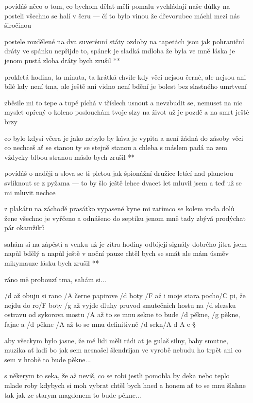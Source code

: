 povídáš něco o tom, co bychom dělat měli
pomalu vychládají naše důlky na posteli
všechno se halí v šeru --- čí to bylo vinou
že dřevorubec máchl mezi nás širočinou

\R postele rozdělené na dva suverénní státy
   ozdoby na tapetách jsou jak pohraniční dráty
   ve spánku nepřijde to, spánek je sladká mdloba
   že byla ve mně láska je jenom pustá zloba
   dráty bych zrušil **

prokletá hodina, ta minuta, ta krátká chvíle
kdy věci nejsou černé, ale nejsou ani bílé
kdy není tma, ale ještě ani vidno není
bdění je bolest bez slastného umrtvení \songgg

zběsile mi to tepe a tupě píchá v tříslech
usnout a nevzbudit se, nemuset na nic myslet
opřený o koleno poslouchám tvoje slzy
na život už je pozdě a na smrt ještě brzy

\R co bylo kdysi včera je jako nebylo by
   káva je vypita a není žádná do zásoby
   věci co nechceš ať se stanou ty se stejně stanou
   a chleba s máslem padá na zem vždycky blbou stranou
   máslo bych zrušil **

povídáš o naději a slova se ti pletou
jak špionážní družice letící nad planetou
svlíknout se z pyžama --- to by šlo ještě lehce
dvacet let mluvil jsem a teď už se mi mluvit nechce \s

z plakátu na záchodě prasátko vypasené
kyne mi zatímco se kolem voda dolů žene
všechno je vyřčeno a odnášeno do septiku
jenom mně tady zbývá prodýchat pár okamžiků

\R sahám si na zápěstí a venku už je zítra
   hodiny odbíjejí signály dobrého jitra
   jsem napůl bdělý a napůl ještě v noční pauze
   chtěl bych se smát ale mám úsměv mikymauze
   lásku bych zrušil **

ráno mě probouzí tma, sahám si...




/d až obuju si rano /A černe papirove /d boty
/F až i moje stara pocho/C pi, že nejdu do ro/F boty
/g až vyjde dluhy pruvod smutečnich hostu
na /d slezsku ostravu od sykorova mostu
/A až to se mnu sekne
to bude /d pěkne, /g pěkne, fajne a /d pěkne
/A až to se mnu definitivně /d sekn/{A d A} e \S

aby všeckym bylo jasne, že mě lidi měli rádi
ať je gulaš silny, baby smutne, muzika ať ladi
bo jak sem nesnašel šlendrijan ve vyrobě
nebudu ho trpět ani co sem v hrobě
to bude pěkne... \s

s někerym to seka, že až neviš, co se robi
jestli pomohla by deka nebo teplo mlade roby
kdybych si moh vybrat chtěl bych hned a honem
ať to se mnu šlahne tak jak ze starym magdonem
to bude pěkne... \s

